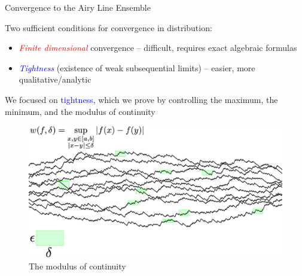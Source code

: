 \documentclass[9pt,t,dvipsnames]{beamer}
\begin{document}
\begin{frame}{Convergence to the Airy Line Ensemble}
	
	Two sufficient conditions for convergence in distribution:
	\begin{itemize}
		
			\item \textcolor{red}{\textit{Finite dimensional}} convergence -- difficult, requires exact algebraic formulas
			
			\item \textcolor{blue}{\textit{Tightness}} (existence of weak subsequential limits) -- easier, more qualitative/analytic
	\end{itemize}

	We focused on \textcolor{blue}{tightness}, which we prove by controlling the maximum, the minimum, and the modulus of continuity
\begin{figure}
	\includegraphics[height=0.45\textheight]{graphics/ModulusCont.jpg}
	\caption{The modulus of continuity}
\end{figure}

\end{frame}
\end{document}
